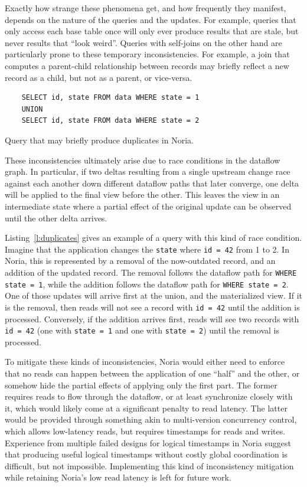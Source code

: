 Exactly how strange these phenomena get, and how frequently they manifest,
depends on the nature of the queries and the updates. For example, queries that
only access each base table once will only ever produce results that are stale,
but never results that ``look weird''. Queries with self-joins on the other hand
are particularly prone to these temporary inconsistencies. For example, a join
that computes a parent-child relationship between records may briefly reflect a
new record as a child, but not as a parent, or vice-versa.

\begin{listing}[h]
  \begin{verbatim}
    SELECT id, state FROM data WHERE state = 1
    UNION
    SELECT id, state FROM data WHERE state = 2
  \end{verbatim}
  \caption{Query that may briefly produce duplicates in Noria.}
  \label{l:duplicates}
\end{listing}

These inconsistencies ultimately arise due to race conditions in the dataflow
graph. In particular, if two deltas resulting from a single upstream change race
against each another down different dataflow paths that later converge, one
delta will be applied to the final view before the other. This leaves the view
in an intermediate state where a partial effect of the original update can be
observed until the other delta arrives.

Listing~\vref{l:duplicates} gives an example of a query with this kind of race
condition. Imagine that the application changes the \texttt{state} where
\texttt{id = 42} from 1 to 2. In Noria, this is represented by a removal of the
now-outdated record, and an addition of the updated record. The removal follows
the dataflow path for \texttt{WHERE state = 1}, while the addition follows the
dataflow path for \texttt{WHERE state = 2}. One of those updates will arrive
first at the union, and the materialized view. If it is the removal, then reads
will not see a record with \texttt{id = 42} until the addition is processed.
Conversely, if the addition arrives first, reads will see two records with
\texttt{id = 42} (one with \texttt{state = 1} and one with \texttt{state = 2})
until the removal is processed.

To mitigate these kinds of inconsistencies, Noria would either need to enforce
that no reads can happen between the application of one ``half'' and the other,
or somehow hide the partial effects of applying only the first part. The former
requires reads to flow through the dataflow, or at least synchronize closely
with it, which would likely come at a significant penalty to read latency. The
latter would be provided through something akin to multi-version concurrency
control, which allows low-latency reads, but requires timestamps for reads and
writes. Experience from multiple failed designs for logical timestamps in Noria
suggest that producing useful logical timestamps without costly global
coordination is difficult, but not impossible. Implementing this kind of
inconsistency mitigation while retaining Noria's low read latency is left for
future work.

